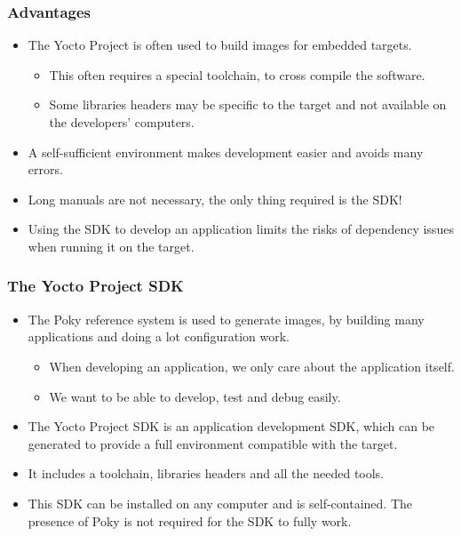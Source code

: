 \begin{frame}
  \frametitle{Advantages}
  \begin{itemize}
    \item The Yocto Project is often used to build images for embedded
      targets.
      \begin{itemize}
        \item This often requires a special toolchain, to cross
          compile the software.
        \item Some libraries headers may be specific to the target
          and not available on the developers' computers.
      \end{itemize}
    \item A self-sufficient environment makes development easier and
      avoids many errors.
    \item Long manuals are not necessary, the only thing required is
      the SDK!
    \item Using the SDK to develop an application limits the risks of
      dependency issues when running it on the target.
  \end{itemize}
\end{frame}

\begin{frame}
  \frametitle{The Yocto Project SDK}
  \begin{itemize}
    \item The Poky reference system is used to generate images, by
      building many applications and doing a lot configuration work.
      \begin{itemize}
        \item When developing an application, we only care about the
          application itself.
        \item We want to be able to develop, test and debug easily.
      \end{itemize}
    \item The Yocto Project SDK is an application development SDK,
      which can be generated to provide a full environment compatible
      with the target.
    \item It includes a toolchain, libraries headers and all the
      needed tools.
    \item This SDK can be installed on any computer and is
      self-contained. The presence of Poky is not required for the SDK
      to fully work.
  \end{itemize}
\end{frame}

